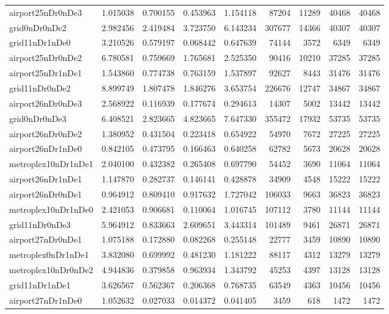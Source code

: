 \begin{longtable}{|l|r|r|r|r|r|r|r|r|}
airport25nDr0nDe3 & 1.015038 & 0.700155 & 0.453963 & 1.154118 & 87204 & 11289 & 40468 & 40468 \\
grid0nDr0nDe2 & 2.982456 & 2.419484 & 3.723750 & 6.143234 & 307677 & 14366 & 40307 & 40307 \\
grid11nDr1nDe0 & 3.210526 & 0.579197 & 0.068442 & 0.647639 & 74144 & 3572 & 6349 & 6349 \\
airport25nDr0nDe2 & 6.780581 & 0.759669 & 1.765681 & 2.525350 & 90416 & 10210 & 37285 & 37285 \\
airport25nDr1nDe1 & 1.543860 & 0.774738 & 0.763159 & 1.537897 & 92627 & 8443 & 31476 & 31476 \\
grid11nDr0nDe2 & 8.899749 & 1.807478 & 1.846276 & 3.653754 & 226676 & 12747 & 34867 & 34867 \\
airport26nDr0nDe3 & 2.568922 & 0.116939 & 0.177674 & 0.294613 & 14307 & 5002 & 13442 & 13442 \\
grid0nDr0nDe3 & 6.408521 & 2.823665 & 4.823665 & 7.647330 & 355472 & 17932 & 53735 & 53735 \\
airport26nDr0nDe2 & 1.380952 & 0.431504 & 0.223418 & 0.654922 & 54970 & 7672 & 27225 & 27225 \\
airport26nDr1nDe0 & 0.842105 & 0.473795 & 0.166463 & 0.640258 & 62782 & 5673 & 20628 & 20628 \\
metroplex10nDr1nDe1 & 2.040100 & 0.432382 & 0.265408 & 0.697790 & 54452 & 3690 & 11064 & 11064 \\
airport26nDr1nDe1 & 1.147870 & 0.282737 & 0.146141 & 0.428878 & 34909 & 4548 & 15222 & 15222 \\
airport26nDr0nDe1 & 0.964912 & 0.809410 & 0.917632 & 1.727042 & 106033 & 9663 & 36823 & 36823 \\
metroplex10nDr1nDe0 & 2.421053 & 0.906681 & 0.110064 & 1.016745 & 107112 & 3780 & 11144 & 11144 \\
grid11nDr0nDe3 & 5.964912 & 0.833663 & 2.609651 & 3.443314 & 101489 & 9461 & 26871 & 26871 \\
airport27nDr0nDe1 & 1.075188 & 0.172880 & 0.082268 & 0.255148 & 22777 & 3459 & 10890 & 10890 \\
metroplex0nDr1nDe1 & 3.832080 & 0.699992 & 0.481230 & 1.181222 & 88117 & 4312 & 13279 & 13279 \\
metroplex10nDr0nDe2 & 4.944836 & 0.379858 & 0.963934 & 1.343792 & 45253 & 4397 & 13128 & 13128 \\
grid11nDr1nDe1 & 3.626567 & 0.562367 & 0.206368 & 0.768735 & 63549 & 4363 & 10456 & 10456 \\
airport27nDr1nDe0 & 1.052632 & 0.027033 & 0.014372 & 0.041405 & 3459 & 618 & 1472 & 1472 \\

\end{longtable}
